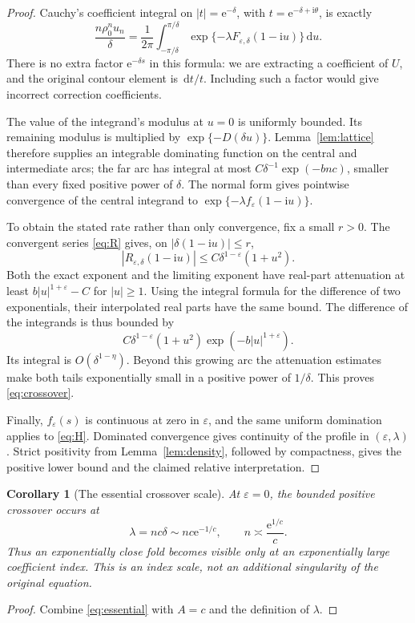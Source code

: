 \documentclass[11pt,a4paper]{article}
\numberwithin{equation}{section}
\newtheorem{corollary}[theorem]{Corollary}
\theoremstyle{definition}
\theoremstyle{remark}
\newcommand{\dd}{\,\mathrm d}\newcommand{\ii}{\mathrm i}
\newcommand{\ep}{\varepsilon}\newcommand{\la}{\lambda}
\newcommand{\rhob}{\rho_0}\newcommand{\ee}{\mathrm e}
\begin{document}
\begin{proof}
Cauchy's coefficient integral on \(|t|=\ee^{-\delta}\), with
\(t=\ee^{-\delta+\ii\theta}\), is exactly
\begin{equation}\label{eq:integral-exact}
 \frac{n\rhob^n u_n}{\delta}
 =\frac1{2\pi}\int_{-\pi/\delta}^{\pi/\delta}
  \exp\{-\la F_{\ep,\delta}(1-\ii u)\}\dd u.
\end{equation}
There is no extra factor \(\ee^{-\delta s}\) in this formula: we are
extracting a coefficient of \(U\), and the original contour element is
\(\dd t/t\). Including such a factor would give incorrect correction
coefficients.

The value of the integrand's modulus at \(u=0\) is uniformly bounded.
Its remaining modulus is multiplied by
\(\exp\{-D(\delta u)\}\). Lemma~\ref{lem:lattice} therefore supplies an
integrable dominating function on the central and intermediate arcs;
the far arc has integral at most
\(C\delta^{-1}\exp(-bnc)\), smaller than every fixed positive power of
\(\delta\). The normal form gives pointwise convergence of the central
integrand to \(\exp\{-\la f_\ep(1-\ii u)\}\).

To obtain the stated rate rather than only convergence, fix a small
\(r>0\). The convergent series \eqref{eq:R} gives, on
\(|\delta(1-\ii u)|\le r\),
\begin{equation}\label{eq:R-growing}
 |R_{\ep,\delta}(1-\ii u)|
 \le C\delta^{1-\ep}(1+u^2).
\end{equation}
Both the exact exponent and the limiting exponent have real-part
attenuation at least \(b|u|^{1+\ep}-C\) for \(|u|\ge1\).
Using the integral formula for the difference of two exponentials, their
interpolated real parts have the same bound. The difference of the
integrands is thus bounded by
\[
 C\delta^{1-\ep}(1+u^2)\exp(-b|u|^{1+\ep}).
\]
Its integral is \(O(\delta^{1-\eta})\). Beyond this growing arc the
attenuation estimates make both tails exponentially small in a
positive power of \(1/\delta\). This proves \eqref{eq:crossover}.

Finally, \(f_\ep(s)\) is continuous at zero in \(\ep\), and the same
uniform domination applies to \eqref{eq:H}. Dominated convergence gives
continuity of the profile in \((\ep,\la)\). Strict positivity from
Lemma~\ref{lem:density}, followed by compactness, gives the positive
lower bound and the claimed relative interpretation.
\end{proof}

\begin{corollary}[The essential crossover scale]\label{cor:scale}
At \(\ep=0\), the bounded positive crossover occurs at
\begin{equation}\label{eq:scale}
 \la=nc\delta\sim nc\ee^{-1/c},
 \qquad n\asymp\frac{\ee^{1/c}}c.
\end{equation}
Thus an exponentially close fold becomes visible only at an exponentially
large coefficient index. This is an index scale, not an additional
singularity of the original equation.
\end{corollary}
\begin{proof}
Combine \eqref{eq:essential} with \(A=c\) and the definition of \(\la\).
\end{proof}
\end{document}
